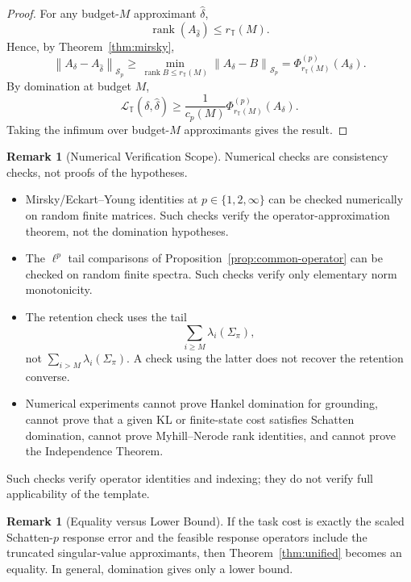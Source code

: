 \documentclass[12pt]{article}
\theoremstyle{definition}
\newtheorem{remark}[theorem]{Remark}
\DeclareMathOperator{\rank}{rank}
\newcommand{\norm}[1]{\left\lVert#1\right\rVert}
\newcommand{\Sp}[1]{\mathcal S_{#1}}
\begin{document}
\begin{proof}
For any budget-$M$ approximant $\widehat\delta$,
\[
\rank(A_{\widehat\delta})
\le
r_{\mathbb T}(M).
\]
Hence, by Theorem~\ref{thm:mirsky},
\[
\norm{A_\delta-A_{\widehat\delta}}_{\Sp{p}}
\ge
\min_{\rank B\le r_{\mathbb T}(M)}
\norm{A_\delta-B}_{\Sp{p}}
=
\Phi^{(p)}_{r_{\mathbb T}(M)}(A_\delta).
\]
By domination at budget $M$,
\[
\mathcal L_{\mathbb T}(\delta,\widehat\delta)
\ge
\frac1{c_p(M)}
\Phi^{(p)}_{r_{\mathbb T}(M)}(A_\delta).
\]
Taking the infimum over budget-$M$ approximants gives the result.
\end{proof}

\begin{remark}[Numerical Verification Scope]
\label{rem:schatten-numerical-scope}
Numerical checks are consistency checks, not proofs of the hypotheses.
\begin{itemize}[leftmargin=1.6em]
\item Mirsky/Eckart--Young identities at $p\in\{1,2,\infty\}$ can be checked
numerically on random finite matrices.  Such checks verify the
operator-approximation theorem, not the domination hypotheses.
\item The $\ell^p$ tail comparisons of Proposition~\ref{prop:common-operator}
can be checked on random finite spectra.  Such checks verify only
elementary norm monotonicity.
\item The retention check uses the tail
\[
\sum_{i\ge M}
\lambda_i(\Sigma_\pi),
\]
not $\sum_{i>M}\lambda_i(\Sigma_\pi)$.  A check using the latter does
not recover the retention converse.
\item Numerical experiments cannot prove Hankel domination for grounding,
cannot prove that a given KL or finite-state cost satisfies Schatten
domination, cannot prove Myhill--Nerode rank identities, and cannot
prove the Independence Theorem.
\end{itemize}
Such checks verify operator identities and indexing; they do not verify full
applicability of the template.
\end{remark}

\begin{remark}[Equality versus Lower Bound]
\label{rem:unified-equality}
If the task cost is exactly the scaled Schatten-$p$ response error and the
feasible response operators include the truncated singular-value approximants,
then Theorem~\ref{thm:unified} becomes an equality.  In general, domination
gives only a lower bound.
\end{remark}
\end{document}
